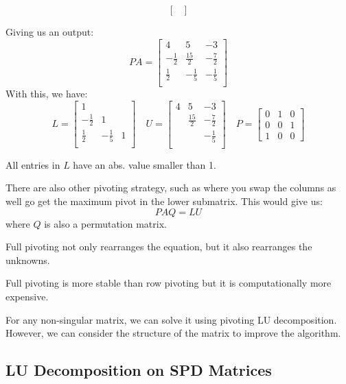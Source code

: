 \documentclass[../main/main.tex]{subfiles}
\begin{document}
\begin{example}
\begin{enumerate}
\[\begin{bmatrix}
    \end{bmatrix}
            \]
    \end{enumerate}
    Giving us an output: \[
      PA =
    \begin{bmatrix}
      4&5&-3\\
      -\frac{1}{2}&\frac{15}{2}&-\frac{7}{2}\\
      \frac{1}{2}&-\frac{1}{5}&-\frac{1}{5} \\
    \end{bmatrix}
    \]
    With this, we have: \[
      L =
    \begin{bmatrix}
      1&&\\
      -\frac{1}{2}&1&\\
      \frac{1}{2}&-\frac{1}{5}&1 \\
    \end{bmatrix}
    \quad U =
    \begin{bmatrix}
      4&5&-3\\
      &\frac{15}{2}&-\frac{7}{2}\\
      &&-\frac{1}{5} \\
    \end{bmatrix}
    \quad P =
    \begin{bmatrix}
      0&1&0\\
      0&0&1\\
    1&0&0
    \end{bmatrix}
    \]
  \end{example}
  \begin{remark}
All entries in $L$ have an abs. value smaller than 1.
  \end{remark}
  There are also other pivoting strategy, such as  where you swap the columns as well go get the maximum pivot in the lower submatrix. This would give us: \[PAQ = LU\] where $Q$ is also a permutation matrix.
  \begin{remark}
Full pivoting not only rearranges the equation, but it also rearranges the unknowns.
  \end{remark}
  \begin{remark}
Full pivoting is more stable than row pivoting but it is computationally more expensive.
  \end{remark}
  For any non-singular matrix, we can solve it using pivoting LU decomposition. However, we can consider the structure of the matrix to improve the algorithm.

  \subsection{LU Decomposition on SPD Matrices}
\end{document}
